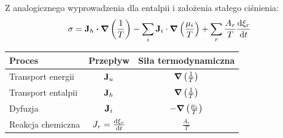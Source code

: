 \documentclass[10pt, a4paper, twoside, onecolumn]{article}
\numberwithin{equation}{section}
\begin{document}
	Z analogicznego wyprowadzenia dla entalpii i założenia stałego ciśnienia:
	\begin{equation}
		\sigma=\vb{J}_{h}\vdot\grad{\left(\frac{1}{T}\right)}-\sum_{i}\vb{J}_{i}\cdot\grad{\left(\frac{\mu_{i}}{T}\right)}+\sum_{r}\frac{A_{r}}{T}\dv{\xi_{r}}{t}
	\end{equation}
	\begin{table}[H]
	\centering
	\begin{tabular}{|l|c|c|}
		\hline
		Proces & Przepływ & Siła termodynamiczna \\
		\hline
		Transport energii & \(\vb{J}_u\) & \(\grad{\left(\frac{1}{T}\right)}\) \\
		Transport entalpii & \(\vb{J}_h\) & \(\grad{\left(\frac{1}{T}\right)}\) \\
		Dyfuzja & \(\vb{J}_i\) & \(-\grad{\left(\frac{\mu_{i}}{T}\right)}\) \\
		Reakcja chemiczna & \(J_{r}=\dv{\xi_{r}}{t}\) & \(\frac{A_r}{T}\) \\
		\hline
	\end{tabular}
	\end{table}
	\pagebreak
\end{document}
